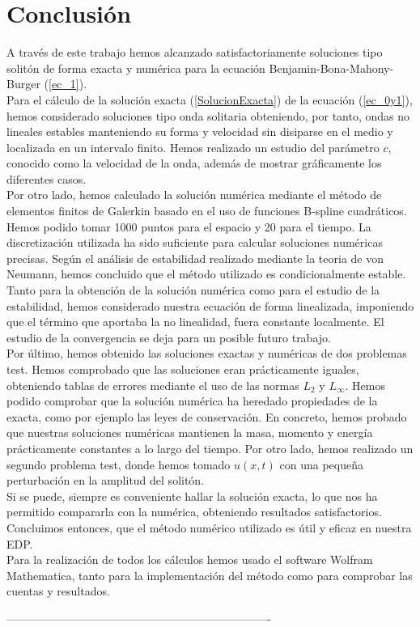 \chapter{Conclusión}

A través de este trabajo hemos alcanzado satisfactoriamente soluciones tipo solitón de forma exacta y numérica para la ecuación Benjamin-Bona-Mahony-Burger (\ref{ec_1}).\\

Para el cálculo de la solución exacta (\ref{SolucionExacta}) de la ecuación (\ref{ec_0y1}), hemos considerado soluciones tipo onda solitaria obteniendo, por tanto, ondas no lineales estables manteniendo su forma y velocidad sin disiparse en el medio y localizada en un intervalo finito. Hemos realizado un estudio del parámetro $c$, conocido como la velocidad de la onda, además de mostrar gráficamente los diferentes casos.\\

Por otro lado, hemos calculado la solución numérica mediante el método de elementos finitos de Galerkin basado en el uso de funciones B-spline cuadráticos. Hemos podido tomar 1000 puntos para el espacio y 20 para el tiempo. La discretización utilizada ha sido suficiente para calcular soluciones numéricas precisas. Según el análisis de estabilidad realizado mediante la teoria de von Neumann, hemos concluido que el método utilizado es condicionalmente estable. Tanto para la obtención de la solución numérica como para el estudio de la estabilidad, hemos considerado nuestra ecuación de forma linealizada, imponiendo que el término que aportaba la no linealidad, fuera  constante localmente. El estudio de la convergencia se deja para un posible futuro trabajo.\\


Por último, hemos obtenido las soluciones exactas y numéricas de dos problemas test. Hemos comprobado que las soluciones eran prácticamente iguales, obteniendo tablas de errores mediante el uso de las normas $L_{2}$ y $L_{\infty}$. Hemos podido comprobar que la solución numérica ha heredado propiedades de la exacta, como por ejemplo las leyes de conservación. En concreto, hemos probado que nuestras soluciones numéricas mantienen la masa, momento y energía prácticamente constantes a lo largo del tiempo. Por otro lado, hemos realizado un segundo problema test, donde hemos tomado $u(x,t)$ con una pequeña perturbación en la amplitud del solitón.\\

Si se puede, siempre es conveniente hallar la solución exacta, lo que nos ha permitido compararla con la numérica, obteniendo resultados satisfactorios. Concluimos entonces, que el método numérico utilizado es útil y eficaz en nuestra EDP.  \\


Para la realización de todos los cálculos hemos usado el software Wolfram Mathematica, tanto para la implementación del método como para comprobar las cuentas y resultados.

----------------------------------------------------------------------

